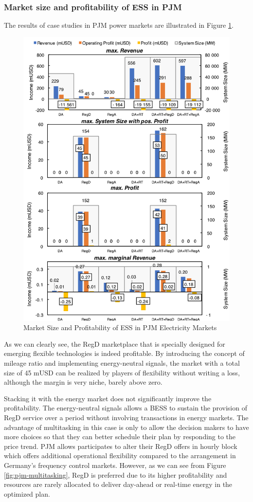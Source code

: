 \subsubsection{Market size and profitability of ESS in PJM}
The results of case studies in PJM power markets are illustrated in Figure \ref{fig:pjm-ess}.
\begin{figure}[h!]
	\centering
	\includegraphics[width=0.9\linewidth]{Figures/PJM_ESS}
	\caption{Market Size and Profitability of ESS in PJM Electricity Markets}
	\label{fig:pjm-ess}
\end{figure}
As we can clearly see, the RegD marketplace that is specially designed for emerging flexible technologies is indeed profitable. By introducing the concept of mileage ratio and implementing energy-neutral signals, the market with a total size of 45 mUSD can be realized by players of flexibility without writing a loss, although the margin is very niche, barely above zero. 

Stacking it with the energy market does not significantly improve the profitability. The energy-neutral signals allows a BESS to sustain the provision of RegD service over a period without involving transactions in energy markets. The advantage of multitasking in this case is only to allow the decision makers to have more choices so that they can better schedule their plan by responding to the price trend. PJM allows participates to alter their RegD offers in hourly block which offers additional operational flexibility compared to the arrangement in Germany's frequency control markets. However, as we can see from Figure \ref{fig:pjm-multitasking}, RegD is preferred due to its higher profitability and resources are rarely allocated to deliver day-ahead or real-time energy in the optimized plan.

